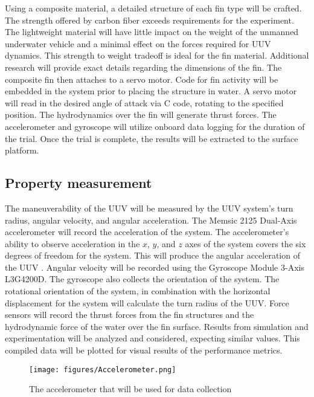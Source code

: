 \documentclass[]{IEEEtran}
\begin{document}
Using a composite material, a detailed structure of each fin type will be crafted.  The strength offered by carbon fiber exceeds requirements for the experiment.  The lightweight material will have little impact on the weight of the unmanned underwater vehicle and a minimal effect on the forces required for UUV dynamics.  This strength to weight tradeoff is ideal for the fin material.  Additional research will provide exact details regarding the dimensions of the fin.  The composite fin then attaches to a servo motor.  Code for fin activity will be embedded in the system prior to placing the structure in water.  A servo motor will read in the desired angle of attack via C code, rotating to the specified position.  The hydrodynamics over the fin will generate thrust forces.  The accelerometer and gyroscope will utilize onboard data logging for the duration of the trial.  Once the trial is complete, the results will be extracted to the surface platform.  

\subsection{Property measurement}
The maneuverability of the UUV will be measured by the UUV system’s turn radius, angular velocity, and angular acceleration. The Memsic 2125 Dual-Axis accelerometer will record the acceleration of the system.  The accelerometer’s ability to observe acceleration in the $x$, $y$, and $z$ axes of the system covers the six degrees of freedom for the system.  This will produce the angular acceleration of the UUV \cite{parallax2013}.  Angular velocity will be recorded using the Gyroscope Module 3-Axis L3G4200D.  The gyroscope also collects the orientation of the system.  The rotational orientation of the system, in combination with the horizontal displacement for the system will calculate the turn radius of the UUV.  Force sensors will record the thrust forces from the fin structures and the hydrodynamic force of the water over the fin surface.  Results from simulation and experimentation will be analyzed and considered, expecting similar values.  This compiled data will be plotted for visual results of the performance metrics.  
\begin{figure}
\begin{center}
\texttt{[image: figures/Accelerometer.png]}
\end{center}
\caption{The accelerometer that will be used for data collection \cite{parallax2013}}
\label{fig:6}
\end{figure}
\end{document}

